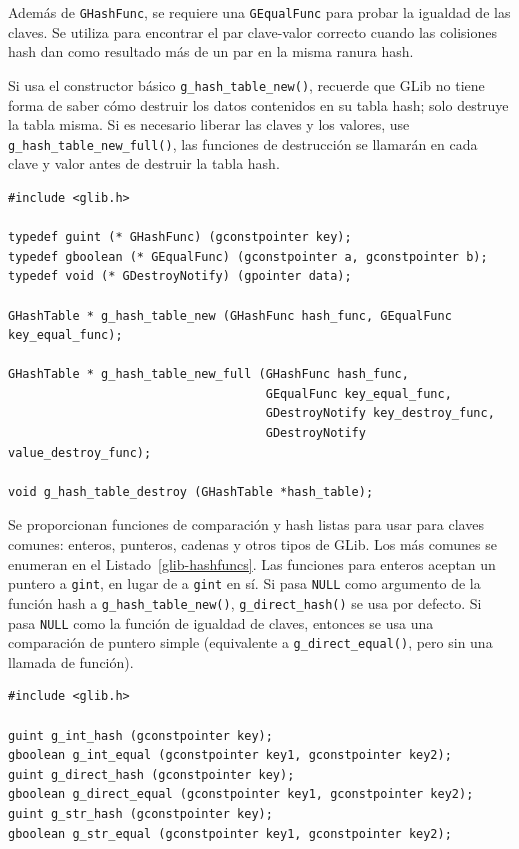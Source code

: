 Además de \lstinline{GHashFunc}, se requiere una \lstinline{GEqualFunc} para probar la igualdad de las claves. Se utiliza para encontrar el par clave-valor correcto cuando las colisiones hash dan como resultado más de un par en la misma ranura hash.

Si usa el constructor básico \lstinline{g_hash_table_new()}, recuerde que GLib no tiene forma de saber cómo destruir los datos contenidos en su tabla hash; solo destruye la tabla misma. Si es necesario liberar las claves y los valores, use \lstinline{g_hash_table_new_full()}, las funciones de destrucción se llamarán en cada clave y valor antes de destruir la tabla hash.

\begin{lstlisting}[float, caption={\lstinline{GHashTable} constructores y destructores}, label=glib-hashnew]
#include <glib.h>

typedef guint (* GHashFunc) (gconstpointer key);
typedef gboolean (* GEqualFunc) (gconstpointer a, gconstpointer b);
typedef void (* GDestroyNotify) (gpointer data);

GHashTable * g_hash_table_new (GHashFunc hash_func, GEqualFunc key_equal_func);

GHashTable * g_hash_table_new_full (GHashFunc hash_func,
                                    GEqualFunc key_equal_func,
                                    GDestroyNotify key_destroy_func,
                                    GDestroyNotify value_destroy_func);

void g_hash_table_destroy (GHashTable *hash_table);
\end{lstlisting}

Se proporcionan funciones de comparación y hash listas para usar para claves comunes: enteros, punteros, cadenas y otros tipos de GLib. Los más comunes se enumeran en el Listado~\ref{glib-hashfuncs}. Las funciones para enteros aceptan un puntero a \lstinline{gint}, en lugar de a \lstinline{gint} en sí. Si pasa \lstinline{NULL} como argumento de la función hash a \lstinline{g_hash_table_new()}, \lstinline{g_direct_hash()} se usa por defecto. Si pasa \lstinline{NULL} como la función de igualdad de claves, entonces se usa una comparación de puntero simple (equivalente a \lstinline{g_direct_equal()}, pero sin una llamada de función).

\begin{lstlisting}[float, caption={Hashes/comparaciones preescritos}, label=glib-hashfuncs]
#include <glib.h>

guint g_int_hash (gconstpointer key);
gboolean g_int_equal (gconstpointer key1, gconstpointer key2);
guint g_direct_hash (gconstpointer key);
gboolean g_direct_equal (gconstpointer key1, gconstpointer key2);
guint g_str_hash (gconstpointer key);
gboolean g_str_equal (gconstpointer key1, gconstpointer key2);
\end{lstlisting}

